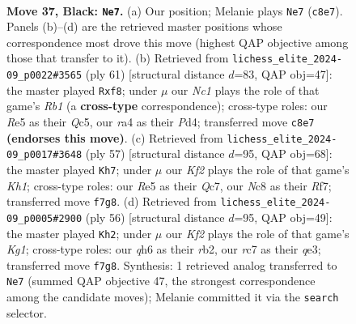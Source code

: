 \documentclass[11pt]{article}
\begin{document}
\clearpage

\begin{figure}[p]\centering
\begin{subfigure}{0.46\textwidth}\centering
\resizebox{\linewidth}{!}{%
\newchessgame
\chessboard[
  setfen={1rn5/2R2k2/p2p2pQ/3qr2p/Rp2p2P/8/4NPP1/5K2 b - - 1 37},
  showmover=false,
  pgfstyle=straightmove, color=movearrow, markmove={c8-e7}
]}
\caption{}
\end{subfigure}\hfill
\begin{subfigure}{0.46\textwidth}\centering
\resizebox{\linewidth}{!}{%
\newchessgame
\chessboard[
  setfen={1r3R1k/3Q2p1/7p/p1qp4/1p1p4/8/PP4PP/3R3K b - - 0 31},
  showmover=false,
  pgfstyle=straightmove, color=movearrow, markmove={b8-f8}
]}
\caption{}
\end{subfigure}
\\[4pt]
\begin{subfigure}{0.46\textwidth}\centering
\resizebox{\linewidth}{!}{%
\newchessgame
\chessboard[
  setfen={4R2k/1pq2rp1/2pr4/p5Q1/P4p2/1B5P/1PP3P1/6K1 b - - 1 29},
  showmover=false,
  pgfstyle=straightmove, color=movearrow, markmove={h8-h7}
]}
\caption{}
\end{subfigure}\hfill
\begin{subfigure}{0.46\textwidth}\centering
\resizebox{\linewidth}{!}{%
\newchessgame
\chessboard[
  setfen={6k1/pp3p2/5p1p/2P1n3/1P5R/4qPP1/Pr4P1/3R1QK1 w - - 2 29},
  showmover=false,
  pgfstyle=straightmove, color=movearrow, markmove={g1-h2}
]}
\caption{}
\end{subfigure}
\caption{\textbf{Move 37, Black: \texttt{Ne7}.} (a) Our position; Melanie plays \texttt{Ne7} (\texttt{c8e7}). Panels (b)--(d) are the retrieved master positions whose correspondence most drove this move (highest QAP objective among those that transfer to it). (b) Retrieved from \texttt{lichess\_elite\_2024-09\_p0022\#3565} (ply 61) [structural distance $d$=83, QAP obj=47]: the master played \texttt{Rxf8}; under $\mu$ our \emph{Nc1} plays the role of that game's \emph{Rb1} (a \textbf{cross-type} correspondence); cross-type roles: our \emph{R}e5 as their \emph{Q}c5, our \emph{r}a4 as their \emph{P}d4; transferred move \texttt{c8e7} \textbf{(endorses this move)}. (c) Retrieved from \texttt{lichess\_elite\_2024-09\_p0017\#3648} (ply 57) [structural distance $d$=95, QAP obj=68]: the master played \texttt{Kh7}; under $\mu$ our \emph{Kf2} plays the role of that game's \emph{Kh1}; cross-type roles: our \emph{R}e5 as their \emph{Q}c7, our \emph{N}c8 as their \emph{R}f7; transferred move \texttt{f7g8}. (d) Retrieved from \texttt{lichess\_elite\_2024-09\_p0005\#2900} (ply 56) [structural distance $d$=95, QAP obj=49]: the master played \texttt{Kh2}; under $\mu$ our \emph{Kf2} plays the role of that game's \emph{Kg1}; cross-type roles: our \emph{q}h6 as their \emph{r}b2, our \emph{r}c7 as their \emph{q}e3; transferred move \texttt{f7g8}. Synthesis: 1 retrieved analog transferred to \texttt{Ne7} (summed QAP objective 47, the strongest correspondence among the candidate moves); Melanie committed it via the \texttt{search} selector.}
\label{fig:thought-m73}
\end{figure}
\end{document}
